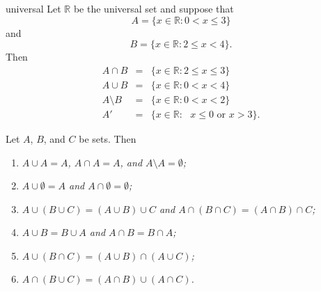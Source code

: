 
 
\begin{example}{universal}
Let ${\mathbb R}$ be the universal set and suppose that
$$
A = \{ x \in {\mathbb R} : 0 < x \leq 3 \}
$$
and
$$
B = \{ x \in {\mathbb R} : 2 \leq x < 4 \}.
$$
Then
\begin{eqnarray*}
A \cap B & = & \{ x \in {\mathbb R} : 2 \leq x \leq 3 \} \\
A \cup B & = & \{ x \in {\mathbb R} : 0 < x < 4 \} \\
A \setminus B & = & \{ x \in {\mathbb R} : 0 < x < 2  \} \\
A' & = & \{ x \in {\mathbb R} : \mbox{ $x \leq 0$ or $x > 3$
} \}.
\end{eqnarray*}
\end{example}
 
\begin{proposition}\label{sets_theorem_set_ops}
Let $A$, $B$, and $C$ be sets. Then
\begin{enumerate}
 
\rm \item \it
$A \cup A = A$, $A \cap A = A$, and $A \setminus A = \emptyset$;
 
\rm \item \it
$A \cup \emptyset = A$ and $A \cap \emptyset = \emptyset$;
 
\rm \item \it
$A \cup (B \cup C) = (A \cup B) \cup C$ and  $A \cap (B \cap C) = (A \cap B) \cap C$;
 
\rm \item \it
$A \cup B = B \cup A$ and $A \cap B = B \cap A$;
 
\rm \item \it
$A \cup (B \cap C) = (A \cup B) \cap (A \cup C)$;
 
\rm \item \it
$A \cap (B \cup C) = (A \cap B) \cup (A \cap C)$.
 
\end{enumerate}
\end{proposition}


